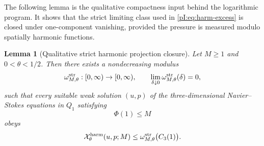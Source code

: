 \documentclass[11pt]{article}
\numberwithin{equation}{section}
\theoremstyle{plain}
\newtheorem{lemma}{Lemma}[section]
\theoremstyle{definition}
\theoremstyle{remark}
\newcommand{\calX}{\mathcal X}
\begin{document}
The following lemma is the qualitative compactness input behind the logarithmic program.  It shows that the strict limiting class used in \eqref{pI:eq:harm-excess} is closed under one-component vanishing, provided the pressure is measured modulo spatially harmonic functions.

\begin{lemma}[Qualitative strict harmonic projection closure]
\label{pI:lem:qual-strict-harmonic-projection}
Let \(M\ge1\) and \(0<\theta<1/2\).  Then there exists a nondecreasing modulus
\[
        \omega^{\rm str}_{M,\theta}:[0,\infty)\to[0,\infty),
        \qquad
        \lim_{\delta\downarrow0}\omega^{\rm str}_{M,\theta}(\delta)=0,
\]
such that every suitable weak solution \((u,p)\) of the three-dimensional Navier--Stokes equations in \(Q_1\) satisfying
\[
        \Phi(1)\le M
\]
obeys
\[
        \calX^{\rm harm}_\theta(u,p;M)
        \le
        \omega^{\rm str}_{M,\theta}\bigl(C_3(1)\bigr).
\]
\end{lemma}
\end{document}
